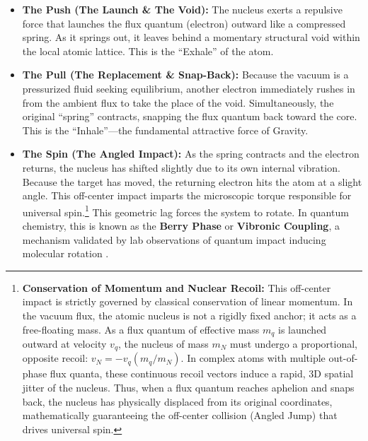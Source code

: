 \documentclass[11pt, a4paper]{article}
\begin{document}
\begin{itemize}
  \item \textbf{The Push (The Launch \& The Void):} The nucleus exerts a repulsive force that launches the flux quantum (electron) outward like a compressed spring. As it springs out, it leaves behind a momentary structural void within the local atomic lattice. This is the ``Exhale'' of the atom.
  
  \item \textbf{The Pull (The Replacement \& Snap-Back):} Because the vacuum is a pressurized fluid seeking equilibrium, another electron immediately rushes in from the ambient flux to take the place of the void. Simultaneously, the original ``spring'' contracts, snapping the flux quantum back toward the core. This is the ``Inhale''---the fundamental attractive force of Gravity.
  
  \item \textbf{The Spin (The Angled Impact):} As the spring contracts and the electron returns, the nucleus has shifted slightly due to its own internal vibration. Because the target has moved, the returning electron hits the atom at a slight angle. This off-center impact imparts the microscopic torque responsible for universal spin.\footnote{\textbf{Conservation of Momentum and Nuclear Recoil:} This off-center impact is strictly governed by classical conservation of linear momentum. In the vacuum flux, the atomic nucleus is not a rigidly fixed anchor; it acts as a free-floating mass. As a flux quantum of effective mass $m_q$ is launched outward at velocity $v_q$, the nucleus of mass $m_N$ must undergo a proportional, opposite recoil: $v_N = -v_q (m_q / m_N)$. In complex atoms with multiple out-of-phase flux quanta, these continuous recoil vectors induce a rapid, 3D spatial jitter of the nucleus. Thus, when a flux quantum reaches aphelion and snaps back, the nucleus has physically displaced from its original coordinates, mathematically guaranteeing the off-center collision (Angled Jump) that drives universal spin.} This geometric lag forces the system to rotate. In quantum chemistry, this is known as the \textbf{Berry Phase} or \textbf{Vibronic Coupling}, a mechanism validated by lab observations of quantum impact inducing molecular rotation \cite{faure2001}.
\end{itemize}
\end{document}
